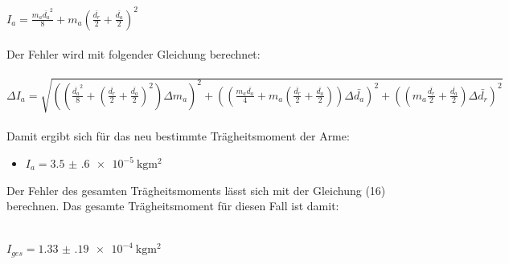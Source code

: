 $I_a = \frac{m_a \bar{d_a}^2}{8} + m_a \left( \frac{\bar{d_r}}{2} + \frac{\bar{d_a}}{2} \right)^2$\\\\

Der Fehler wird mit folgender Gleichung berechnet:\\\\

$\Delta I_a = \sqrt{\left(\left( \frac{\bar{d_a}^2}{8} + \left( \frac{\bar{d_r}}{2} +
 \frac{\bar{d_a}}{2} \right)^2\right)  \Delta m_a \right)^2
  + \left(\left( \frac{m_a \bar{d_a}}{4} + m_a \left( \frac{\bar{d_r}}{2} +
  \frac{\bar{d_a}}{2} \right)\right)  \Delta \bar{d_a} \right)^2
  + \left( \left( m_a \frac{\bar{d_r}}{2} + \frac{\bar{d_a}}{2} \right)  \Delta \bar{d_r} \right)^2}$\\\\

Damit ergibt sich für das neu bestimmte Trägheitsmoment der Arme:

\begin{itemize}
  \item $I_a = \SI{3.5(6)e-5}{\kilo\gram\meter\squared}$
\end{itemize}

Der Fehler des gesamten Trägheitsmoments lässt sich mit der Gleichung (16) berechnen.
Das gesamte Trägheitsmoment für diesen Fall ist damit:\\\\

\centerline{$I_{ges} = \SI{1.33(19)e-4}{\kilo\gram\meter\squared}$}
